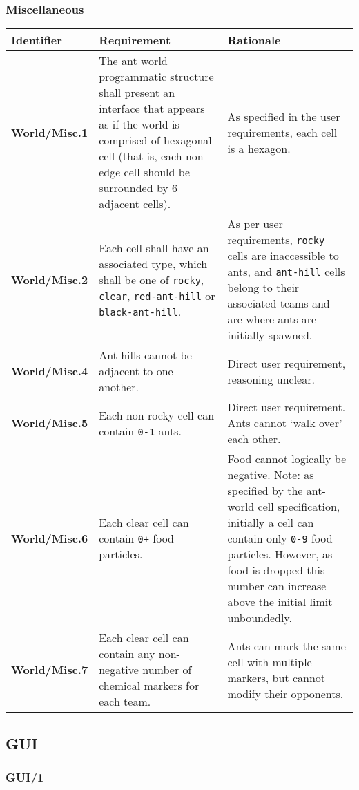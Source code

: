 \documentclass[11pt]{article}
\begin{document}
\subsubsection*{Miscellaneous}\label{miscellaneous-2}

\begin{longtable}[c]{|p{}|p{}|p{}|}
\hline
Identifier & Requirement & Rationale\tabularnewline
\hline

\textbf{World/Misc.1} & The ant world programmatic structure shall
present an interface that appears as if the world is comprised of
hexagonal cell (that is, each non-edge cell should be surrounded by 6
adjacent cells). & As specified in the user requirements, each cell is a
hexagon.\tabularnewline
\textbf{World/Misc.2} & Each cell shall have an associated type, which
shall be one of \texttt{rocky}, \texttt{clear}, \texttt{red-ant-hill} or
\texttt{black-ant-hill}. & As per user requirements, \texttt{rocky}
cells are inaccessible to ants, and \texttt{ant-hill} cells belong to
their associated teams and are where ants are initially
spawned.\tabularnewline
\textbf{World/Misc.4} & Ant hills cannot be adjacent to one another. &
Direct user requirement, reasoning unclear.\tabularnewline
\textbf{World/Misc.5} & Each non-rocky cell can contain \texttt{0-1}
ants. & Direct user requirement. Ants cannot `walk over' each
other.\tabularnewline
\textbf{World/Misc.6} & Each clear cell can contain \texttt{0+} food
particles. & Food cannot logically be negative. Note: as specified by
the ant-world cell specification, initially a cell can contain only
\texttt{0-9} food particles. However, as food is dropped this number can
increase above the initial limit unboundedly.\tabularnewline
\textbf{World/Misc.7} & Each clear cell can contain any non-negative
number of chemical markers for each team. & Ants can mark the same cell
with multiple markers, but cannot modify their opponents.\tabularnewline
\hline
\end{longtable}

\subsection{GUI}\label{gui}

\subsubsection*{GUI/1}\label{gui1}
\end{document}
